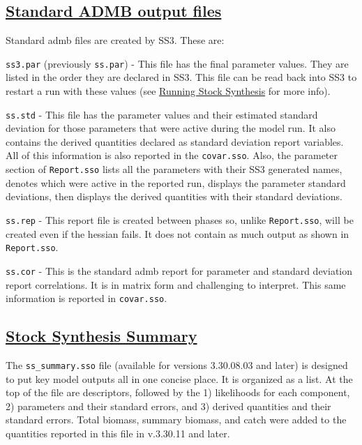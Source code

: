 \hypertarget{ADMBOutput}{}
\subsection[Standard ADMB output files]{\protect\hyperlink{ADMBOutput}{Standard ADMB output files}}
Standard \gls{admb} files are created by SS3. These are:

\texttt{ss3.par} (previously \texttt{ss.par}) - This file has the final parameter values. They are listed in the order they are declared in SS3. This file can be read back into SS3 to restart a run with these values (see \hyperref[sec:RunningSS3]{Running Stock Synthesis} for more info).

\texttt{ss.std} - This file has the parameter values and their estimated standard deviation for those parameters that were active during the model run. It also contains the derived quantities declared as standard deviation report variables. All of this information is also reported in the \texttt{covar.sso}. Also, the parameter section of \texttt{Report.sso} lists all the parameters with their SS3 generated names, denotes which were active in the reported run, displays the parameter standard deviations, then displays the derived quantities with their standard deviations.

\texttt{ss.rep} - This report file is created between phases so, unlike \texttt{Report.sso}, will be created even if the hessian fails. It does not contain as much output as shown in \texttt{Report.sso}.

\texttt{ss.cor} - This is the standard \gls{admb} report for parameter and standard deviation report correlations. It is in matrix form and challenging to interpret. This same information is reported in \texttt{covar.sso}.

\hypertarget{SS3Summary}{}
\subsection[Stock Synthesis Summary]{\protect\hyperlink{SS3Summary}{Stock Synthesis Summary}}
The \texttt{ss\_summary.sso} file (available for versions 3.30.08.03 and later) is designed to put key model outputs all in one concise place. It is organized as a list. At the top of the file are descriptors, followed by the 1) likelihoods for each component, 2) parameters and their standard errors, and 3) derived quantities and their standard errors. Total biomass, summary biomass, and catch were added to the quantities reported in this file in v.3.30.11 and later.

